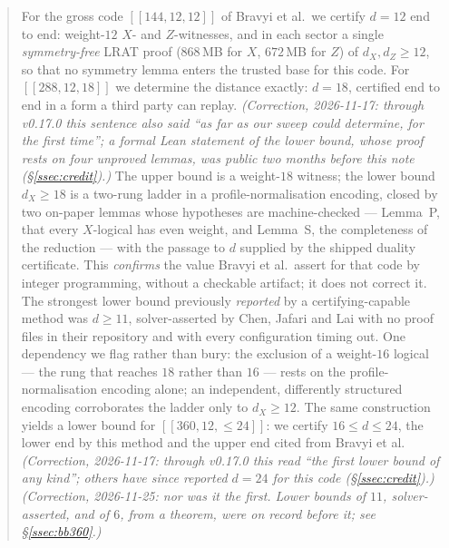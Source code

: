 \documentclass[11pt]{amsart}
\newcommand{\dX}{d_{X}}
\newcommand{\dZ}{d_{Z}}
\newcommand{\gross}{[[144,12,12]]}
\theoremstyle{plain}
\theoremstyle{definition}
\theoremstyle{remark}
\begin{document}
\begin{abstract}
For the gross code $\gross$ of Bravyi et al.\ we certify $d=12$ end to end:
weight-$12$ $X$- and $Z$-witnesses, and in each sector a single
\emph{symmetry-free} LRAT proof ($868$\,MB for $X$, $672$\,MB for $Z$) of
$\dX,\dZ\ge 12$, so that no symmetry lemma enters the trusted base for this
code. For $[[288,12,18]]$ we determine the distance exactly: $d=18$, certified
end to end in a form a third party can replay. \emph{(Correction, 2026-11-17:
through v0.17.0 this sentence also said ``as far as our sweep could
determine, for the first time''; a formal Lean statement of the lower bound,
whose proof rests on four unproved lemmas, was public two months before this
note (\S\ref{ssec:credit}).)} The upper bound is a weight-$18$ witness; the
lower bound $\dX\ge18$ is a two-rung ladder in a profile-normalisation
encoding, closed by two on-paper lemmas whose hypotheses are machine-checked
--- Lemma~P, that every $X$-logical has even weight, and Lemma~S, the
completeness of the reduction --- with the passage to $d$ supplied by the
shipped duality certificate. This \emph{confirms} the value Bravyi et al.\
assert for that code by integer programming, without a checkable artifact; it
does not correct it. The strongest lower bound previously \emph{reported} by a
certifying-capable method was $d\ge11$, solver-asserted by Chen, Jafari and Lai
with no proof files in their repository and with every configuration timing
out. One dependency we flag rather than bury: the exclusion of a weight-$16$
logical --- the rung that reaches $18$ rather than $16$ --- rests on the
profile-normalisation encoding alone; an independent, differently structured
encoding corroborates the ladder only to $\dX\ge12$. The same construction
yields a lower bound for $[[360,12,\le24]]$: we certify
$16\le d\le24$, the lower end by this method and the upper end cited from
Bravyi et al. \emph{(Correction, 2026-11-17: through v0.17.0 this read ``the
first lower bound of any kind''; others have since reported $d=24$ for this
code (\S\ref{ssec:credit}).)} \emph{(Correction, 2026-11-25: nor was it the
first. Lower bounds of $11$, solver-asserted, and of $6$, from a theorem, were
on record before it; see \S\ref{ssec:bb360}.)}


\end{abstract}
\end{document}
